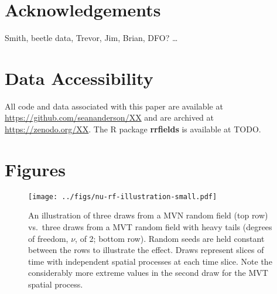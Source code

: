 \documentclass[12pt,english]{article}
\begin{document}
\begin{spacing}{1.9}
\section{Acknowledgements}

Smith, beetle data, Trevor, Jim, Brian, DFO? \ldots

\section{Data Accessibility}

All code and data associated with this paper are available at
\url{https://github.com/seananderson/XX} and are archived at
\url{https://zenodo.org/XX}.
The R package \textbf{rrfields} is available at TODO.



\clearpage

\section{Figures}

\begin{figure}[htb]
  \begin{center}
    \texttt{[image: ../figs/nu-rf-illustration-small.pdf]}
    \caption{An illustration of three draws from a MVN random field (top row)
      vs.\ three draws from a MVT random field with heavy tails
      (degrees of freedom, $\nu$, of 2; bottom row). Random seeds are held constant
      between the rows
      to illustrate the effect. Draws represent slices of time with independent spatial
      processes at each time slice. Note the considerably more extreme values in
      the second draw for the MVT spatial process.}
    \label{fig:nu}
  \end{center}
\end{figure}

\clearpage


\end{spacing}
\end{document}

